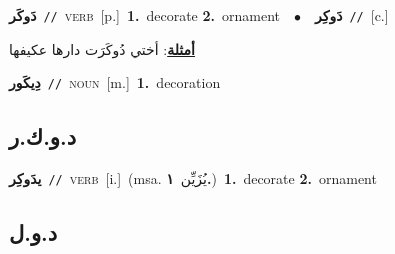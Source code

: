 \documentclass[10pt,a4paper,twoside]{article} %
\begin{document}
\begin{multicols}{2}
{\setlength\topsep{0pt}\textbf{\foreignlanguage{arabic}{دَوكَر}}\ {\color{gray}\texttt{//}\color{black}}\ \textsc{verb}\ [p.]\ \textbf{1.}~decorate  \textbf{2.}~ornament\ \ $\bullet$\ \ \setlength\topsep{0pt}\textbf{\foreignlanguage{arabic}{دَوكِر}}\ {\color{gray}\texttt{//}\color{black}}\ [c.]\  \begin{flushright}\color{gray}\foreignlanguage{arabic}{\textbf{\underline{\foreignlanguage{arabic}{أمثلة}}}: أختي دُوكَرَت دارها عكيفها}\end{flushright}\color{black}} \vspace{2mm}

{\setlength\topsep{0pt}\textbf{\foreignlanguage{arabic}{دِيكَور}}\ {\color{gray}\texttt{//}\color{black}}\ \textsc{noun}\ [m.]\ \textbf{1.}~decoration\ } \vspace{2mm}

\vspace{-3mm}
\subsection*{\color{blue}\foreignlanguage{arabic}{د.و.ك.ر}\color{blue}{ (ntws)}} 

{\setlength\topsep{0pt}\textbf{\foreignlanguage{arabic}{يدَوكِر}}\ {\color{gray}\texttt{//}\color{black}}\ \textsc{verb}\ [i.]\ \color{gray}(msa. \foreignlanguage{arabic}{يُزَيِّن}~\foreignlanguage{arabic}{\textbf{١.}})\color{black}\ \textbf{1.}~decorate  \textbf{2.}~ornament\ } \vspace{2mm}

\vspace{-3mm}
\subsection*{\color{blue}\foreignlanguage{arabic}{د.و.ل}\color{blue}{}} 


\end{multicols}
\end{document}
